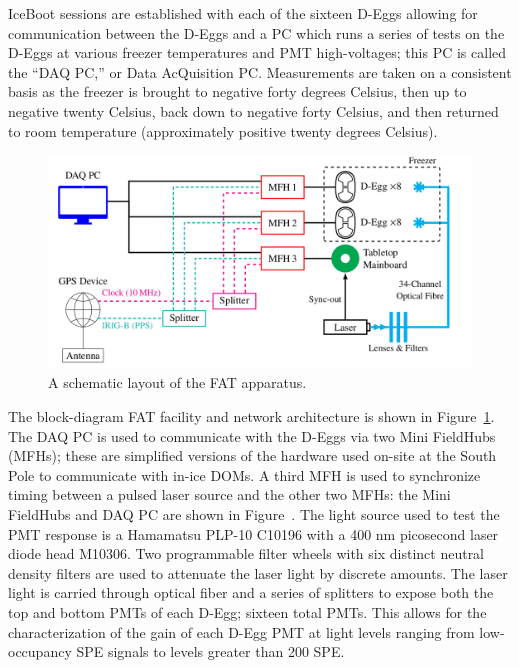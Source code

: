 \documentclass[main.tex]{subfiles}
\begin{document}
IceBoot sessions are established with each of the sixteen D-Eggs allowing for communication between the D-Eggs and a PC which runs a series of tests on the D-Eggs at various freezer temperatures and PMT high-voltages; this PC is called the ``DAQ PC,'' or Data AcQuisition PC. 
Measurements are taken on a consistent basis as the freezer is brought to negative forty degrees Celsius, then up to negative twenty Celsius, back down to negative forty Celsius, and then returned to room temperature (approximately positive twenty degrees Celsius). 

\begin{figure}
    \centering
    \includegraphics[width=\linewidth]{figures/fat_layout.png}
    \caption{A schematic layout of the FAT apparatus. }
    \label{fig:fatscheme}
\end{figure}

The block-diagram FAT facility and network architecture is shown in Figure~\ref{fig:fatscheme}. 
The DAQ PC is used to communicate with the D-Eggs via two Mini FieldHubs (MFHs); these are simplified versions of the hardware used on-site at the South Pole to communicate with in-ice DOMs. 
A third MFH is used to synchronize timing between a pulsed laser source and the other two MFHs: the Mini FieldHubs and DAQ PC are shown in Figure~\cite{fig:degg_fat_pc}.
The light source used to test the PMT response is a Hamamatsu PLP-10 C10196 with a 400 nm picosecond laser diode head M10306.
Two programmable filter wheels with six distinct neutral density filters are used to attenuate the laser light by discrete amounts. 
The laser light is carried through optical fiber and a series of splitters to expose both the top and bottom PMTs of each D-Egg; sixteen total PMTs.
This allows for the characterization of the gain of each D-Egg PMT at light levels ranging from low-occupancy SPE signals to levels greater than 200 SPE. 
\end{document}

